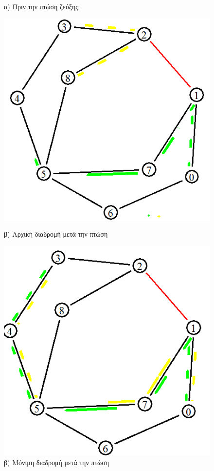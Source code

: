 \documentclass{article}%
\begin{document}
\begin{itemize}
\begin{figure}[htbp]
\begin{minipage}{0.36\textwidth}
\caption{α) Πριν την πτώση ζεύξης}
\end{minipage}\hfill
\begin{minipage}{0.35\textwidth}
\centering
\includegraphics[width=1.00\textwidth]{7.png}
\caption{β) Αρχική διαδρομή μετά την πτώση}
\end{minipage}
\begin{minipage}{0.35\textwidth}
\centering
\includegraphics[width=1.00\textwidth]{8.png}
\caption{β) Μόνιμη διαδρομή μετά την πτώση}
\end{minipage}


\end{figure}
\end{itemize}
\end{document}
